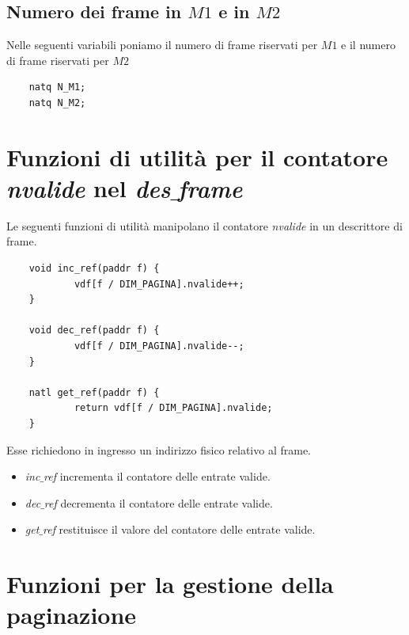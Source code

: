 \documentclass[11pt]{report}
\theoremstyle{definition}
\begin{document}
\subsection{Numero dei frame in $M1$ e in $M2$} 
Nelle seguenti variabili poniamo il numero di frame riservati per $M1$ e il numero di frame riservati per $M2$
\begin{verbatim}
	natq N_M1;
	natq N_M2;
\end{verbatim}

\section{Funzioni di utilità per il contatore \emph{nvalide} nel \emph{des$\_$frame}}
Le seguenti funzioni di utilità manipolano il contatore \emph{nvalide} in un descrittore di frame. 
\small 
\begin{verbatim}
	void inc_ref(paddr f) {
		    vdf[f / DIM_PAGINA].nvalide++;
	}
	
	void dec_ref(paddr f) {
		    vdf[f / DIM_PAGINA].nvalide--;
	}
	
	natl get_ref(paddr f) {
		    return vdf[f / DIM_PAGINA].nvalide;
	}
\end{verbatim}
\normalsize 
Esse richiedono in ingresso un indirizzo fisico relativo al  frame.
\begin{itemize}
	\item \emph{inc$\_$ref} incrementa il contatore delle entrate valide.
	\item \emph{dec$\_$ref} decrementa il contatore delle entrate valide.
	\item \emph{get$\_$ref} restituisce il valore del contatore delle entrate valide.
\end{itemize}

\section{Funzioni per la gestione della paginazione}
\end{document}
